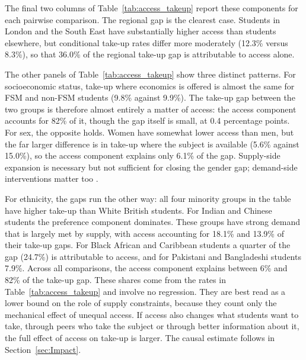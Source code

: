 The final two columns of Table~\ref{tab:access_takeup} report these components for each pairwise comparison. The regional gap is the clearest case. Students in London and the South East have substantially higher access than students elsewhere, but conditional take-up rates differ more moderately (12.3\% versus 8.3\%), so that 36.0\% of the regional take-up gap is attributable to access alone. %


The other panels of Table~\ref{tab:access_takeup} show three distinct patterns. For socioeconomic status, take-up where economics is offered is almost the same for FSM and non-FSM students (9.8\% against 9.9\%). The take-up gap between the two groups is therefore almost entirely a matter of access: the access component accounts for 82\% of it, though the gap itself is small, at 0.4 percentage points. For sex, the opposite holds. Women have somewhat lower access than men, but the far larger difference is in take-up where the subject is available (5.6\% against 15.0\%), so the access component explains only 6.1\% of the gap. Supply-side expansion is necessary but not sufficient for closing the gender gap; demand-side interventions matter too \citep{porter2020rolemodel,smith2025discoverecon}.

For ethnicity, the gaps run the other way: all four minority groups in the table have higher take-up than White British students. For Indian and Chinese students the preference component dominates. These groups have strong demand that is largely met by supply, with access accounting for 18.1\% and 13.9\% of their take-up gaps. For Black African and Caribbean students a quarter of the gap (24.7\%) is attributable to access, and for Pakistani and Bangladeshi students 7.9\%.
Across all comparisons, the access component explains between 6\% and 82\% of the take-up gap. These shares come from the rates in Table~\ref{tab:access_takeup} and involve no regression. They are best read as a lower bound on the role of supply constraints, because they count only the mechanical effect of unequal access. If access also changes what students want to take, through peers who take the subject or through better information about it, the full effect of access on take-up is larger. The causal estimate follows in Section~\ref{sec:Impact}.

